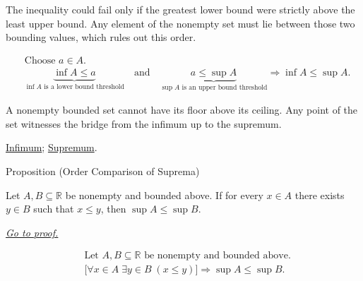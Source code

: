 \begin{remark*}
The inequality could fail only if the greatest lower bound were strictly above the least upper bound. Any element of the nonempty set must lie between those two bounding values, which rules out this order.
\end{remark*}

\begin{remark*}
\[
\begin{aligned}
&\text{Choose }a\in A.\\
&\underbrace{\inf A\le a}_{\inf A\text{ is a lower bound threshold}}
\quad\text{and}\quad
\underbrace{a\le \sup A}_{\sup A\text{ is an upper bound threshold}}
\Longrightarrow
\inf A\le \sup A.
\end{aligned}
\]
\end{remark*}

\begin{remark*}[Interpretation]
A nonempty bounded set cannot have its floor above its ceiling. Any point of the set witnesses the bridge from the infimum up to the supremum.
\end{remark*}

\begin{remark*}[Dependencies]
\hyperref[def:infimum]{Infimum};
\hyperref[def:supremum]{Supremum}.
\end{remark*}


\begin{propositionbox}{Proposition (Order Comparison of Suprema)}
\begin{proposition}
\label{prop:order-comparison-of-suprema}
Let $A,B\subseteq\mathbb{R}$ be nonempty and bounded above. If for every $x\in A$ there exists $y\in B$ such that $x\le y$, then $\sup A\le \sup B$.

\smallskip
\noindent
\hyperref[prf:order-comparison-of-suprema]{\textit{Go to proof.}}
\end{proposition}
\end{propositionbox}

\begin{remark*}
\[
\begin{aligned}
&\text{Let }A,B\subseteq\mathbb{R}\text{ be nonempty and bounded above.}\\
&\bigl[\forall x\in A\;\exists y\in B\;(x\le y)\bigr]
\Longrightarrow
\sup A\le \sup B.
\end{aligned}
\]
\end{remark*}


